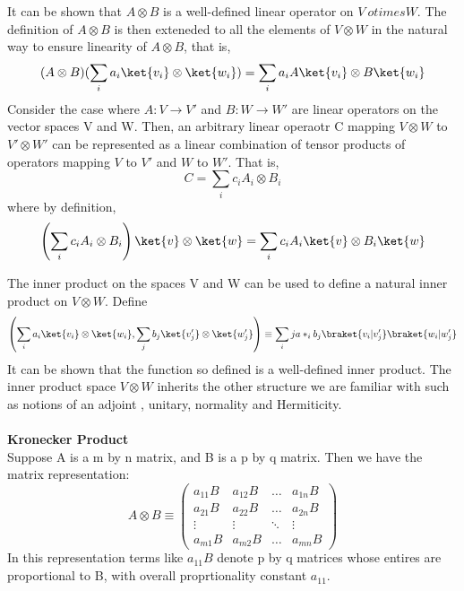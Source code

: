 \documentclass[12pt, oneside]{book}
\theoremstyle{definition}
\theoremstyle{definition}
\theoremstyle{remark}
\begin{document}
It can be shown that $A \otimes B$ is a well-defined linear operator on $V\ otimes W$. The definition of $A \otimes B$ is then exteneded to all the elements of $V \otimes W$ in the natural way to ensure linearity of $A \otimes B$, that is,
\[ (A \otimes B)(\sum_{i} a_{i} \ket{v_i} \otimes \ket{w_i}) = \sum_{i} a_i A\ket{v_i} \otimes B\ket{w_i} \]
Consider the case where $A:V \rightarrow V'$ and $B:W \rightarrow W'$ are linear operators on the vector spaces V and W. Then, 
an arbitrary linear operaotr C mapping $V \otimes W$ to $V' \otimes W'$ can be represented as a linear combination of tensor products of operators mapping 
$V$ to $V'$ and $W$ to $W'$. That is,
\[ C=\sum_{i} c_{i} A_i \otimes B_i \]
where by definition,
\[ \left( \sum_i c_i A_i \otimes B_i\right) \ket{v} \otimes \ket{w} = \sum_i c_i A_i \ket{v} \otimes B_i \ket{w} \]

The inner product on the spaces V and W can be used to define a natural inner product on $V \otimes W$. Define
\[ \left( \sum_i a_i\ket{v_i}\otimes \ket{w_i}, \sum_j b_j \ket{v'_j} \otimes \ket{w'_j}\right) \equiv \sum_ij a*_ib_j\braket{v_i|v'_j}\braket{w_i|w'_j} \]
It can be shown that the function so defined is a well-defined inner product. The inner product space $V \otimes W$ inherits the other structure we are familiar with such as notions of an adjoint , unitary, normality and Hermiticity.\\
\\
\textbf{Kronecker Product}\\
Suppose A is a m by n matrix, and B is a p by q matrix. Then we have the matrix representation:
\[ A \otimes B \equiv \begin{pmatrix} a_{11}B & a_{12}B & \ldots & a_{1n}B \\ a_{21}B & a_{22}B & \ldots & a_{2n}B \\ \vdots & \vdots & \ddots & \vdots \\ a_{m1}B & a_{m2}B & \ldots & a_{mn}B \end{pmatrix} \]
In this representation terms like $a_11B$ denote p by q matrices whose entires are proportional to B, with overall proprtionality constant $a_{11}$. 
\end{document}
